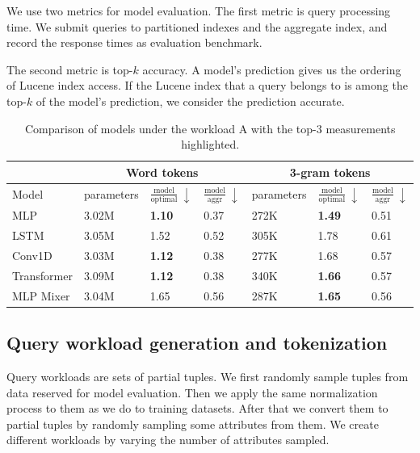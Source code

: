 \documentclass[conference]{IEEEtran}
\begin{document}
We use two metrics for model evaluation. The first metric is query processing time. We submit queries to partitioned indexes and the aggregate index, and record the response times as evaluation benchmark.

The second metric is top-$k$ accuracy. A model's prediction gives us the ordering of Lucene index access. If the Lucene index that a query belongs to is among the top-$k$ of the model's prediction, we consider the prediction accurate.

\begin{table}[t]
    \centering
    \begin{tabularx}{\textwidth}{|l|X||X|X||X|X|X|}
    \hline
    &    \multicolumn{3}{|c|}{Word tokens} & \multicolumn{3}{|c|}{3-gram tokens} \\ \hline
    Model 
        & parameters
        & $\frac{\mathrm{model}}{\mathrm{optimal}}\ \downarrow$
        & $\frac{\mathrm{model}}{\mathrm{aggr}}\ \downarrow$ 
        & parameters
        & $\frac{\mathrm{model}}{\mathrm{optimal}}\ \downarrow$
        & $\frac{\mathrm{model}}{\mathrm{aggr}}\ \downarrow$
        \\ \hline
    MLP & 3.02M & {\bf 1.10} & 0.37 & 272K & {\bf 1.49} & 0.51\\
    LSTM & 3.05M & 1.52 & 0.52 & 305K & 1.78 & 0.61 \\
    Conv1D & 3.03M & {\bf 1.12} & 0.38 & 277K & 1.68 & 0.57 \\
    Transformer & 3.09M & {\bf 1.12} & 0.38 & 340K & {\bf 1.66} & 0.57 \\
    MLP Mixer & 3.04M & 1.65 & 0.56 & 287K & {\bf 1.65} & 0.56 \\ \hline
    \end{tabularx}
    \caption{Comparison of models under the workload A with the top-3 measurements highlighted.}
    \label{tab:model-comparison}
\end{table}

\subsection{Query workload generation and tokenization}
\label{subsection:query_workload_gen}
Query workloads are sets of partial tuples. 
We first randomly sample tuples from data reserved for model evaluation. 
Then we apply the same normalization process to them as we do to training datasets. 
After that we convert them to partial tuples by randomly sampling some attributes from them.
We create different workloads by varying the number of attributes sampled.
\end{document}
